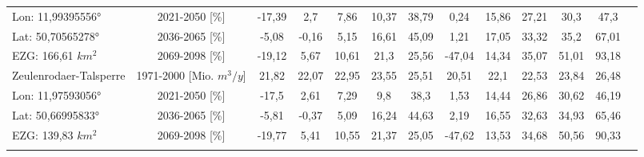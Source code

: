 \begin{longtable}{@{\extracolsep{\fill}}lc|ccccc||cccccc}
\cline{2-13} 
Lon: 11,99395556° & 2021-2050 [\%]  & -17,39 & 2,7 & 7,86 & 10,37 & 38,79 & 0,24 & 15,86 & 27,21 & 30,3 & 47,3 & \\ 
Lat: 50,70565278° & 2036-2065 [\%]  & -5,08 & -0,16 & 5,15 & 16,61 & 45,09 & 1,21 & 17,05 & 33,32 & 35,2 & 67,01 & \\ 
EZG: 166,61 $km^2$ & 2069-2098 [\%]  & -19,12 & 5,67 & 10,61 & 21,3 & 25,56 & -47,04 & 14,34 & 35,07 & 51,01 & 93,18 & \\ 
\hline 
Zeulenrodaer-Talsperre & 1971-2000 [Mio. $m^3/y$]  & 21,82 & 22,07 & 22,95 & 23,55 & 25,51 & 20,51 & 22,1 & 22,53 & 23,84 & 26,48 & \\ 
\cline{2-13} 
Lon: 11,97593056° & 2021-2050 [\%]  & -17,5 & 2,61 & 7,29 & 9,8 & 38,3 & 1,53 & 14,44 & 26,86 & 30,62 & 46,19 & \\ 
Lat: 50,66995833° & 2036-2065 [\%]  & -5,81 & -0,37 & 5,09 & 16,24 & 44,63 & 2,19 & 16,55 & 32,63 & 34,93 & 65,46 & \\ 
EZG: 139,83 $km^2$ & 2069-2098 [\%]  & -19,77 & 5,41 & 10,55 & 21,37 & 25,05 & -47,62 & 13,53 & 34,68 & 50,56 & 90,33 & \\\hline
\label{Qrouted_daily_sum_Talsperrenforlatex_greater50facc}
\end{longtable}
\addtolength{\tabcolsep}{5.9pt}
